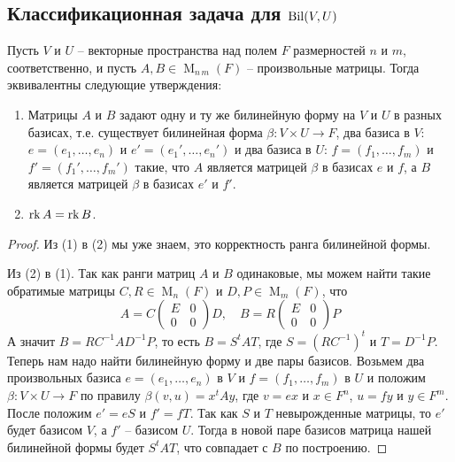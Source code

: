 \subsection{Классификационная задача для $\operatorname{Bil}(V,U)$}

\begin{claim}
Пусть $V$ и $U$ -- векторные пространства над полем $F$ размерностей $n$ и $m$, соответственно, и пусть $A,B\in \operatorname{M}_{n\,m}(F)$ -- произвольные матрицы. Тогда эквивалентны следующие утверждения:
\begin{enumerate}
\item Матрицы $A$ и $B$ задают одну и ту же билинейную форму на $V$ и $U$ в разных базисах, т.е. существует билинейная форма $\beta\colon V\times U\to F$, два базиса в $V$: $e=(e_1,\ldots,e_n)$ и $e'=(e_1',\ldots,e_n')$ и два базиса в $U$: $f=(f_1,\ldots,f_m)$ и $f'=(f_1',\ldots,f_m')$ такие, что $A$ является матрицей $\beta$ в базисах $e$ и $f$, а $B$ является матрицей $\beta$ в базисах $e'$ и $f'$.

\item $\operatorname{rk} A = \operatorname{rk} B$.
\end{enumerate}
\end{claim}
\begin{proof}
Из (1) в (2) мы уже знаем, это корректность ранга билинейной формы.

Из (2) в (1). Так как ранги матриц $A$ и $B$ одинаковые, мы можем найти такие обратимые матрицы $C,R \in \operatorname{M}_{n}(F)$ и $D, P\in \operatorname{M}_{m}(F)$, что
\[
A = C
\begin{pmatrix}
{E}&{0}\\
{0}&{0}
\end{pmatrix}
D,
\quad
B = R
\begin{pmatrix}
{E}&{0}\\
{0}&{0}
\end{pmatrix}
P
\]
А значит $B = RC^{-1}AD^{-1}P$, то есть $B = S^t A T$, где $S = (RC^{-1})^t$ и $T = D^{-1}P$. Теперь нам надо найти билинейную форму  и две пары базисов. Возьмем два произвольных базиса $e=(e_1,\ldots,e_n)$ в $V$ и $f=(f_1,\ldots,f_m)$ в $U$ и положим $\beta\colon V\times U \to F$ по правилу $\beta(v, u) = x^t A y$, где $v = ex$ и $x\in F^n$, $u = f y$ и $y\in F^m$. После положим $e' = e S$ и $f' = fT$. Так как $S$ и $T$ невырожденные матрицы, то $e'$ будет базисом $V$, а $f'$ -- базисом $U$. Тогда в новой паре базисов матрица нашей билинейной формы будет $S^t A T$, что совпадает с $B$ по построению.
\end{proof}

